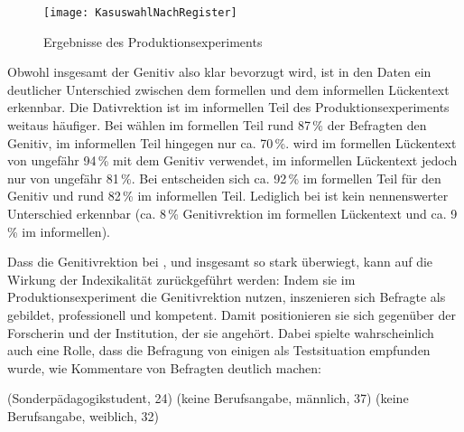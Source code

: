 \begin{figure}
\centering
\texttt{[image: KasuswahlNachRegister]}
\caption{Ergebnisse des Produktionsexperiments}
\label{pic:KasuswahlNachRegister}
\end{figure}

Obwohl insgesamt der Genitiv also klar bevorzugt wird, ist in den Daten ein deutlicher Unterschied zwischen dem formellen und dem informellen Lückentext erkennbar.
Die Dativrektion ist im informellen Teil des Produktionsexperiments weitaus häufiger.
Bei \wegen{} wählen im formellen Teil rund 87\,\% der Befragten den Genitiv, im informellen Teil hingegen nur ca. 70\,\%. 
 wird im formellen Lückentext von ungefähr 94\,\% mit dem Genitiv verwendet, im informellen Lückentext jedoch nur von ungefähr 81\,\%. 
Bei \dank{} entscheiden sich ca. 92\,\% im formellen Teil für den Genitiv und rund 82\,\% im informellen Teil. 
Lediglich bei \gegenueber{} ist kein nennenswerter Unterschied erkennbar (ca. 8\,\% Genitivrektion im formellen Lückentext und ca. 9\,\% im informellen). 

Dass die Genitivrektion bei \wegen, \waehrend{} und \dank{} insgesamt so stark überwiegt, kann auf die Wirkung der Indexikalität zurückgeführt werden: 
Indem sie im Produktionsexperiment die Genitivrektion nutzen, inszenieren sich Befragte als gebildet, professionell und kompetent. 
Damit positionieren sie sich gegenüber der Forscherin und der Institution, der sie angehört. 
Dabei spielte wahrscheinlich auch eine Rolle, dass die Befragung von einigen als Testsituation empfunden wurde, wie Kommentare von Befragten deutlich machen:  
\begin{exe}
\ex {} (Sonderpädagogikstudent, 24) \label{Bsp:Loesungsblatt}
\ex {} (keine Berufsangabe, männlich, 37) \label{Bsp:Aufloesung}
\pagebreak
\ex {} (keine Berufsangabe, weiblich, 32) \label{Bsp:Test}
\end{exe}

